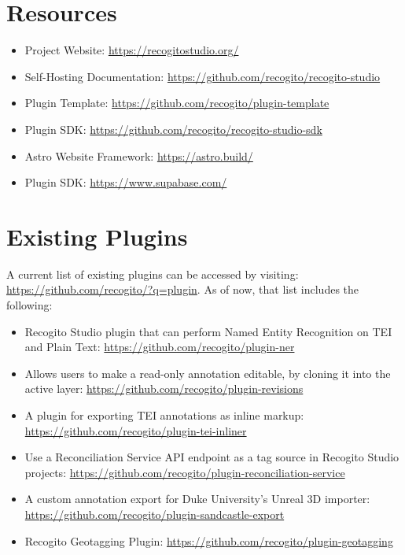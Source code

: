\documentclass[final]{anthology-ch}         %
\begin{document}
\printbibliography

\appendix

\section{Resources} \label{appdx:first_appendix_resources}
\begin{itemize}
  \item Project Website: \url{https://recogitostudio.org/}
  \item Self-Hosting Documentation: \url{https://github.com/recogito/recogito-studio}
  \item Plugin Template: \url{https://github.com/recogito/plugin-template}
  \item Plugin SDK: \url{https://github.com/recogito/recogito-studio-sdk}
  \item Astro Website Framework: \url{https://astro.build/}
  \item Plugin SDK: \url{https://www.supabase.com/}
\end{itemize}

\section{Existing Plugins} \label{appdx:second_appendix_plugins}

A current list of existing plugins can be accessed by visiting: \href{https://github.com/recogito/?q=plugin}{https://github.com/recogito/?q=plugin}. As of now, that list includes the following:

\begin{itemize}
  \item Recogito Studio plugin that can perform Named Entity Recognition on TEI and Plain Text: \url{https://github.com/recogito/plugin-ner}
  \item Allows users to make a read-only annotation editable, by cloning it into the active layer: \url{https://github.com/recogito/plugin-revisions}
  \item A plugin for exporting TEI annotations as inline markup: \url{https://github.com/recogito/plugin-tei-inliner}
  \item Use a Reconciliation Service API endpoint as a tag source in Recogito Studio projects: \url{https://github.com/recogito/plugin-reconciliation-service}
  \item A custom annotation export for Duke University's Unreal 3D importer: \url{https://github.com/recogito/plugin-sandcastle-export}
  \item Recogito Geotagging Plugin: \url{https://github.com/recogito/plugin-geotagging}
\end{itemize}
\end{document}
